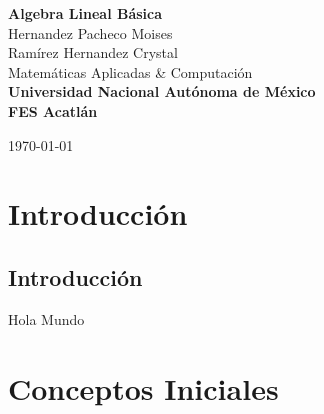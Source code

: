 \documentclass[a4paper,12pt]{report} %
\begin{document}
\begin{titlepage}
    \pagecolor{MidnightBlue}
    \color{white}
    \centering
    {\Huge \textbf{Algebra Lineal Básica}} \\[2.5cm] %
    {\Large Hernandez Pacheco Moises} \\[0.5cm]       %
    {\Large Ramírez Hernandez Crystal} \\[6cm]       %
    \color{SkyBlue}
    {\Large Matemáticas Aplicadas \& Computación} \\[1cm]
    \color{white}
    \textbf{\large Universidad Nacional Autónoma de México} \\[0.5cm]   %
    \textbf{\large FES Acatlán} \\[1cm]   %
    \vfill
    
    \vfill
    {\large \today}                              %
\end{titlepage}

\pagecolor{white}
\color{black}
\tableofcontents %

\newpage
\renewcommand{\thechapter}{\Roman{chapter}}
\part{Introducción}
\renewcommand{\thechapter}{\arabic{chapter}}
\chapter{Introducción}
Hola Mundo

\newpage
\renewcommand{\thechapter}{\Roman{chapter}}
\part{Conceptos Iniciales}
\renewcommand{\thechapter}{\arabic{chapter}}
\end{document}
